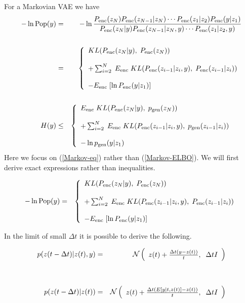 {For a Markovian VAE we have
{\Large
\begin{eqnarray}
  - \ln \mathrm{Pop}(y) & = & - \ln\frac{P_{\mathrm{enc}}(z_N)P_{\mathrm{enc}}(z_{N-1}|z_N)\cdots P_{\mathrm{enc}}(z_1|z_2)P_{\mathrm{enc}}(y|z_1)}{P_{\mathrm{enc}}(z_N|y)P_{\mathrm{enc}}(z_{N-1}|z_N,y)\cdots P_{\mathrm{enc}}(z_1|z_2,y)} \nonumber\\
  \nonumber \\
  & = & \left\{\begin{array}{l} KL(P_{\mathrm{enc}}(z_N|y),\;P_{\mathrm{enc}}(z_N)) \\ \\ + \sum_{i=2}^N  \; E_{\mathrm{enc}}\; KL(P_{\mathrm{enc}}(z_{i-1}|z_i,y),\;P_{\mathrm{enc}}(z_{i-1}|z_i)) \\ \\ - E_{\mathrm{enc}}\;[\ln P_{\mathrm{enc}}(y|z_1)] \end{array}\right. \label{Markov-eq} \\
  \nonumber\\
  H(y) & \leq & \left\{\begin{array}{l} E_{\mathrm{enc}}\;KL(P_{\mathrm{enc}}(z_N|y),\;p_{\mathrm{gen}}(z_N)) \\ \\ + \sum_{i=2}^N  \; E_{\mathrm{enc}}\; KL(P_{\mathrm{enc}}(z_{i-1}|z_i,y),\;p_{\mathrm{gen}}(z_{i-1}|z_i)) \\ \\ - \ln p_{\mathrm{gen}}(y|z_1) \end{array}\right. \;\;\;~\label{Markov-ELBO}
\end{eqnarray}
}Here we focus on (\ref{Markov-eq}) rather than (\ref{Markov-ELBO}).  We will first derive exact expressions rather than inequalities.



{\huge
\begin{eqnarray*}
  - \ln \mathrm{Pop}(y) & = & \left\{\begin{array}{l} KL(P_{\mathrm{enc}}(z_N|y),\;P_{\mathrm{enc}}(z_N)) \\ \\ + \sum_{i=2}^N  \; E_{\mathrm{enc}}\; KL(P_{\mathrm{enc}}(z_{i-1}|z_i,y),\;P_{\mathrm{enc}}(z_{i-1}|z_i)) \\ \\ - E_{\mathrm{enc}}\;[\ln P_{\mathrm{enc}}(y|z_1)] \end{array}\right.
  \end{eqnarray*}
}


In the limit of small $\Delta t$ it is possible to derive the following.

\vfill
\begin{eqnarray*}
  p(z(t - \Delta t)|z(t),y) & = & {\cal N}\left(\begin{array}{l}z(t) + \frac{\Delta t(y - z(t))}{t},\;\; \Delta t I\end{array}\right) \\
  \\
  \\
  p(z(t - \Delta t)|z(t)) & = & {\cal N}\left(\begin{array}{l} z(t) + \frac{\Delta t(E[y|t,z(t)] - z(t))}{t}, \;\; \Delta t I\end{array}\right)
\end{eqnarray*}


}
